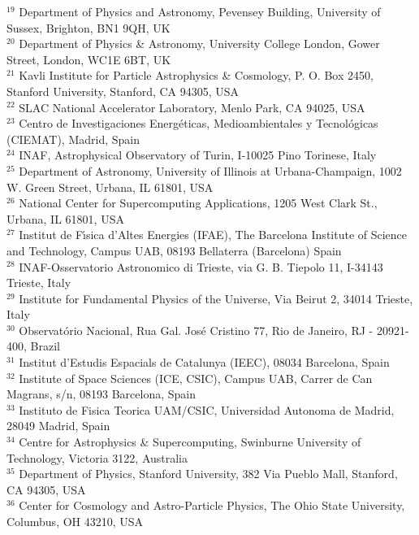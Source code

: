 {$^{19}$ Department of Physics and Astronomy, Pevensey Building, University of Sussex, Brighton, BN1 9QH, UK\\
$^{20}$ Department of Physics \& Astronomy, University College London, Gower Street, London, WC1E 6BT, UK\\
$^{21}$ Kavli Institute for Particle Astrophysics \& Cosmology, P. O. Box 2450, Stanford University, Stanford, CA 94305, USA\\
$^{22}$ SLAC National Accelerator Laboratory, Menlo Park, CA 94025, USA\\
$^{23}$ Centro de Investigaciones Energ\'eticas, Medioambientales y Tecnol\'ogicas (CIEMAT), Madrid, Spain\\
$^{24}$ INAF, Astrophysical Observatory of Turin, I-10025 Pino Torinese, Italy\\
$^{25}$ Department of Astronomy, University of Illinois at Urbana-Champaign, 1002 W. Green Street, Urbana, IL 61801, USA\\
$^{26}$ National Center for Supercomputing Applications, 1205 West Clark St., Urbana, IL 61801, USA\\
$^{27}$ Institut de F\'{\i}sica d'Altes Energies (IFAE), The Barcelona Institute of Science and Technology, Campus UAB, 08193 Bellaterra (Barcelona) Spain\\
$^{28}$ INAF-Osservatorio Astronomico di Trieste, via G. B. Tiepolo 11, I-34143 Trieste, Italy\\
$^{29}$ Institute for Fundamental Physics of the Universe, Via Beirut 2, 34014 Trieste, Italy\\
$^{30}$ Observat\'orio Nacional, Rua Gal. Jos\'e Cristino 77, Rio de Janeiro, RJ - 20921-400, Brazil\\
$^{31}$ Institut d'Estudis Espacials de Catalunya (IEEC), 08034 Barcelona, Spain\\
$^{32}$ Institute of Space Sciences (ICE, CSIC),  Campus UAB, Carrer de Can Magrans, s/n,  08193 Barcelona, Spain\\
$^{33}$ Instituto de Fisica Teorica UAM/CSIC, Universidad Autonoma de Madrid, 28049 Madrid, Spain\\
$^{34}$ Centre for Astrophysics \& Supercomputing, Swinburne University of Technology, Victoria 3122, Australia\\
$^{35}$ Department of Physics, Stanford University, 382 Via Pueblo Mall, Stanford, CA 94305, USA\\
$^{36}$ Center for Cosmology and Astro-Particle Physics, The Ohio State University, Columbus, OH 43210, USA\\
}
